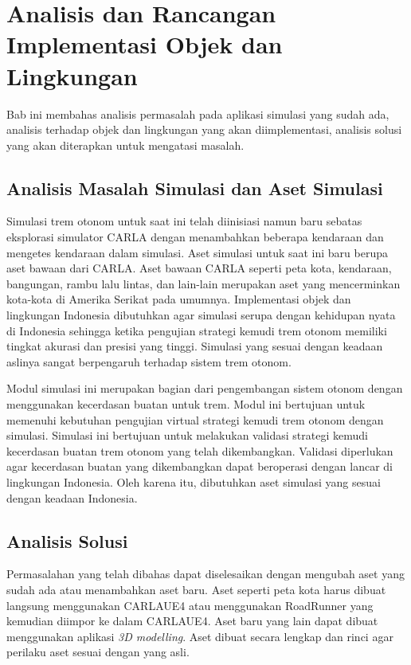 \chapter{Analisis dan Rancangan Implementasi Objek dan Lingkungan}


Bab ini membahas analisis permasalah pada aplikasi simulasi yang sudah ada,
analisis terhadap objek dan lingkungan yang akan diimplementasi, analisis solusi
yang akan diterapkan untuk mengatasi masalah.

\section{Analisis Masalah Simulasi dan Aset Simulasi}
Simulasi trem otonom untuk saat ini telah diinisiasi namun baru sebatas
eksplorasi simulator CARLA dengan menambahkan beberapa kendaraan dan mengetes
kendaraan dalam simulasi. Aset simulasi untuk saat ini baru berupa aset bawaan
dari CARLA. Aset bawaan CARLA seperti peta kota, kendaraan, bangungan, rambu
lalu lintas, dan lain-lain merupakan aset yang mencerminkan kota-kota di Amerika
Serikat pada umumnya. Implementasi objek dan lingkungan Indonesia dibutuhkan
agar simulasi serupa dengan kehidupan nyata di Indonesia sehingga ketika
pengujian strategi kemudi trem otonom memiliki tingkat akurasi dan presisi yang
tinggi. Simulasi yang sesuai dengan keadaan aslinya sangat berpengaruh terhadap
sistem trem otonom.

Modul simulasi ini merupakan bagian dari pengembangan sistem otonom dengan
menggunakan kecerdasan buatan untuk trem. Modul ini bertujuan untuk memenuhi
kebutuhan pengujian virtual strategi kemudi trem otonom dengan simulasi.
Simulasi ini bertujuan untuk melakukan validasi strategi kemudi kecerdasan
buatan trem otonom yang telah dikembangkan. Validasi diperlukan agar kecerdasan
buatan yang dikembangkan dapat beroperasi dengan lancar di lingkungan Indonesia.
Oleh karena itu, dibutuhkan aset simulasi yang sesuai dengan keadaan Indonesia.

\section{Analisis Solusi}
Permasalahan yang telah dibahas dapat diselesaikan dengan mengubah aset yang
sudah ada atau menambahkan aset baru. Aset seperti peta kota harus dibuat
langsung menggunakan CARLAUE4 atau menggunakan RoadRunner yang kemudian diimpor
ke dalam CARLAUE4. Aset baru yang lain dapat dibuat menggunakan aplikasi
\textit{3D modelling}. Aset dibuat secara lengkap dan rinci agar perilaku aset
sesuai dengan yang asli.

